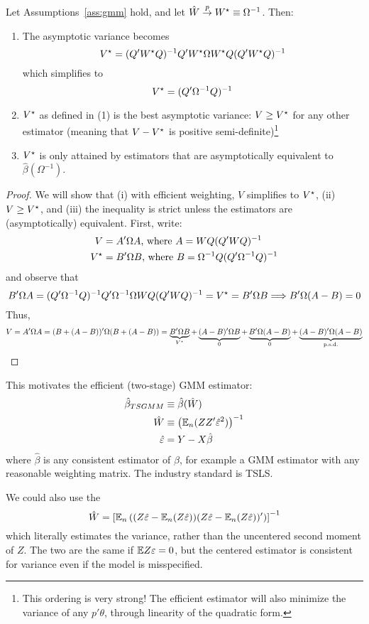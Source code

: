 \documentclass[10pt]{article}
\begin{document}
\begin{theorem}
	Let Assumptions~\ref{ass:gmm} hold, and let $\hat{W} \overset{p}{\to} W^\star \equiv \Omega^{-1}$. Then:
	\begin{enumerate}
		\item The asymptotic variance becomes \[V^\star = (Q'W^\star Q)^{-1}Q'W^\star \Omega W^\star Q(Q'W^\star Q)^{-1}\]which simplifies to \[V^\star = (Q' \Omega^{-1} Q)^{-1}\]
		\item $V^\star$ as defined in (1) is the best asymptotic variance: $V \ge V^\star$ for any other estimator (meaning that $V - V^\star$ is positive semi-definite)\footnote{This ordering is very strong! The efficient estimator will also minimize the variance of any $p' \theta$, through linearity of the quadratic form.}
		\item $V^\star$ is only attained by estimators that are asymptotically equivalent to $\hat{\beta}(\Omega^{-1})$.
	\end{enumerate}
\end{theorem}
\begin{proof}
	We will show that (i) with efficient weighting, $V$ simplifies to $V^\star$, (ii) $V \ge V^\star$, and (iii) the inequality is strict unless the estimators are (asymptotically) equivalent. First, write: \begin{align*} V &= A' \Omega A \text{, where } A = WQ(Q'WQ)^{-1} \\ V^\star &= B' \Omega B \text{, where } B = \Omega^{-1}Q(Q'\Omega^{-1}Q)^{-1} \end{align*}and observe that \[B'\Omega A = (Q'\Omega^{-1}Q)^{-1}Q'\Omega^{-1} \Omega WQ (Q'WQ)^{-1} = V^\star = B'\Omega B \Longrightarrow B'\Omega (A-B) = 0\]Thus,\[V = A'\Omega A = (B + (A - B))'\Omega (B + (A - B)) = \underbrace{B'\Omega B}_{V^\star} + \underbrace{(A-B)' \Omega B}_{0} + \underbrace{B' \Omega (A-B)}_{0} + \underbrace{(A-B)' \Omega (A-B)}_{\textnormal{p.s.d.}}\]
\end{proof}


\begin{remark}
	This motivates the efficient (two-stage) GMM estimator: \begin{align*} \hat{\beta}_{TSGMM} &\equiv \hat{\beta}(\hat{W}) \\ \hat{W} &\equiv \left( \mathbb{E}_n (ZZ' \hat{\varepsilon}^2)\right)^{-1} \\ \hat{\varepsilon} &= Y - X\hat{\beta}\end{align*}where $\hat{\beta}$ is any consistent estimator of $\beta$, for example a GMM estimator with any reasonable weighting matrix. The industry standard is TSLS. 
\end{remark}
\begin{remark}
	We could also use the  \[\hat{W} = \left[\mathbb{E}_n \left( (Z\hat{\varepsilon} - \mathbb{E}_n (Z\hat{\varepsilon}))(Z\hat{\varepsilon} - \mathbb{E}_n (Z\hat{\varepsilon}))'\right)\right]^{-1} \]which literally estimates the variance, rather than the uncentered second moment of $Z$. The two are the same if $\mathbb{E} Z\varepsilon = 0$, but the centered estimator is consistent for variance even if the model is misspecified.
\end{remark}
\end{document}
